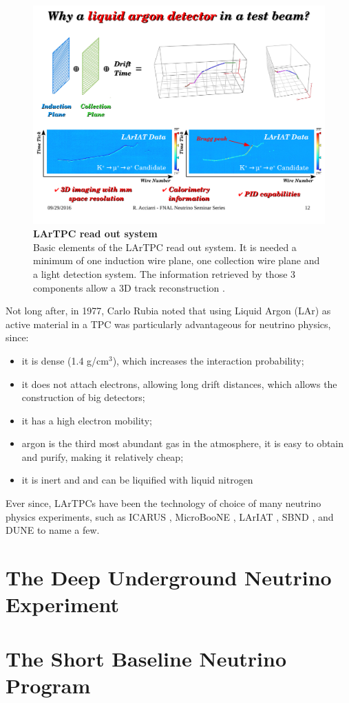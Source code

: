 \begin{figure}
	\begin{center}
		\includegraphics[scale=0.6]{Figures/Acciarri_fig2.pdf}
		\caption[LArTPC read out system]{ {\textbf{LArTPC read out system}} \\ Basic elements of the LArTPC read out system. It is needed a minimum of one induction wire plane, one collection wire plane and a light detection system. The information retrieved by those 3 components allow a 3D track reconstruction \cite{Acciarri_presentation}.}
		\label{lartpc_readout}	
	\end{center}
\end{figure}

\newpage
Not long after, in 1977, Carlo Rubia noted that using Liquid Argon (LAr) as active material in a TPC was particularly advantageous for neutrino physics, since:
\begin{itemize}
	\item it is dense (1.4 g/cm$^3$), which increases the interaction probability;
 	\item it does not attach electrons, allowing long drift distances, which allows the construction of big detectors;
  	\item it has a high electron mobility;
   	\item argon is the third most abundant gas in the atmosphere, it is easy to obtain and purify, making it relatively cheap;
  	\item it is inert and and can be liquified with liquid nitrogen \cite{Rubia_ANewConcept}
\end{itemize}

Ever since, LArTPCs have been the technology of choice of many neutrino physics experiments, such as ICARUS \cite{ICARUS_proposal}, MicroBooNE \cite{MicroBooNE}, LArIAT \cite{LArIAT}, SBND \cite{SBND}, and DUNE \cite{DUNE_proposal} to name a few.  
\section{The Deep Underground Neutrino Experiment}
\section{The Short Baseline Neutrino Program}